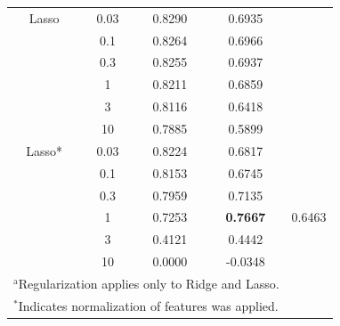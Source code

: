 \documentclass[conference]{IEEEtran}
\begin{document}
\begin{table}[htbp]
\begin{center}
\begin{tabular}{|c|c|c|c|c|}
            \hline
            Lasso           & 0.03                   & 0.8290               & 0.6935             &                     \\
                            & 0.1                    & 0.8264               & 0.6966             &                     \\
                            & 0.3                    & 0.8255               & 0.6937             &                     \\
                            & 1                      & 0.8211               & 0.6859             &                     \\
                            & 3                      & 0.8116               & 0.6418             &                     \\
                            & 10                     & 0.7885               & 0.5899             &                     \\
            \hline
            Lasso*          & 0.03                   & 0.8224               & 0.6817             &                     \\
                            & 0.1                    & 0.8153               & 0.6745             &                     \\
                            & 0.3                    & 0.7959               & 0.7135             &                     \\
                            & 1                      & 0.7253               & \textbf{0.7667}    & 0.6463              \\
                            & 3                      & 0.4121               & 0.4442             &                     \\
                            & 10                     & 0.0000               & -0.0348            &                     \\
            \hline
            \multicolumn{4}{l}{$^{\mathrm{a}}$Regularization applies only to Ridge and Lasso.}                         \\
            \multicolumn{4}{l}{$^*$Indicates normalization of features was applied.}                                   \\
        \end{tabular}
        \label{tab2}
    \end{center}
\end{table}
\end{document}
